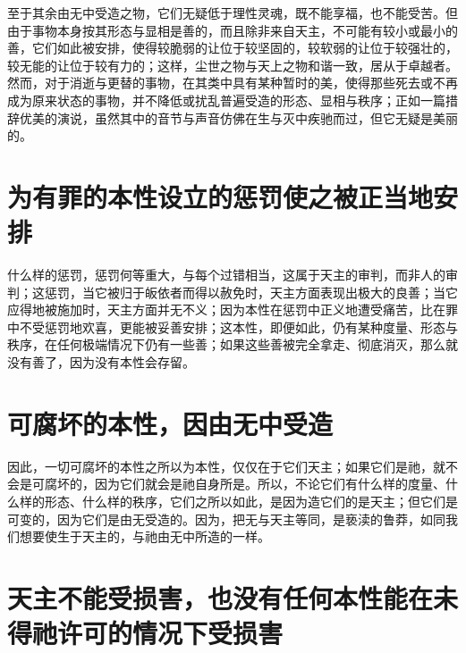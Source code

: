 至于其余由无中受造之物，它们无疑低于理性灵魂，既不能享福，也不能受苦。但由于事物本身按其形态与显相是善的，而且除非来自天主，不可能有较小或最小的善，它们如此被安排，使得较脆弱的让位于较坚固的，较软弱的让位于较强壮的，较无能的让位于较有力的；这样，尘世之物与天上之物和谐一致，居从于卓越者。然而，对于消逝与更替的事物，在其类中具有某种暂时的美，使得那些死去或不再成为原来状态的事物，并不降低或扰乱普遍受造的形态、显相与秩序；正如一篇措辞优美的演说，虽然其中的音节与声音仿佛在生与灭中疾驰而过，但它无疑是美丽的。\par


\section{为有罪的本性设立的惩罚使之被正当地安排}

什么样的惩罚，惩罚何等重大，与每个过错相当，这属于天主的审判，而非人的审判；这惩罚，当它被归于皈依者而得以赦免时，天主方面表现出极大的良善；当它应得地被施加时，天主方面并无不义；因为本性在惩罚中正义地遭受痛苦，比在罪中不受惩罚地欢喜，更能被妥善安排；这本性，即便如此，仍有某种度量、形态与秩序，在任何极端情况下仍有一些善；如果这些善被完全拿走、彻底消灭，那么就没有善了，因为没有本性会存留。\par


\section{可腐坏的本性，因由无中受造}

因此，一切可腐坏的本性之所以为本性，仅仅在于它们天主；如果它们是祂，就不会是可腐坏的，因为它们就会是祂自身所是。所以，不论它们有什么样的度量、什么样的形态、什么样的秩序，它们之所以如此，是因为造它们的是天主；但它们是可变的，因为它们是由无受造的。因为，把无与天主等同，是亵渎的鲁莽，如同我们想要使生于天主的，与祂由无中所造的一样。\par


\section{天主不能受损害，也没有任何本性能在未得祂许可的情况下受损害}

